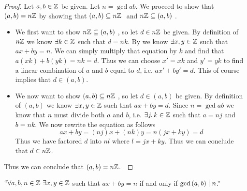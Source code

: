         \begin{proof}
            Let $a, b \in \mathbb{Z}$ be given. Let $n = \gcd{a}{b}$. We proceed to show
            that $(a, b) = n\mathbb{Z}$ by showing that $(a, b) \subseteq n\mathbb{Z} \ $ and 
            $n\mathbb{Z} \subseteq (a, b) \ $.
            \begin{itemize}
                \item
                    We first want to show $n\mathbb{Z} \subseteq (a, b) \ $, so let $d \in n\mathbb{Z}$ be
                    given. By definition of $n\mathbb{Z}$ we know $\exists k \in \mathbb{Z}$ such
                    that $d = nk$. By  we know $\exists
                    x, y \in \mathbb{Z}$ such that $ax + by = n$. We can simply multiply that
                    equation by $k$ and find that $a(xk) + b(yk) = nk = d$. Thus we can choose
                    $x' = xk$ and $y' = yk$ to find a linear combination of $a$ and $b$ equal to
                    $d$, i.e. $ax' + by' = d$. This of course implies that $d \in (a, b)$.
                \item
                    We now want to show $(a, b) \subseteq n\mathbb{Z} \ $, so let $d \in (a, b)$
                    be given. By definition of $(a, b)$ we know $\exists x, y \in \mathbb{Z}$
                    such that $ax + by = d$. Since $n = \gcd{a}{b}$ we know that $n$ must
                    divide both $a$ and $b$, i.e. $\exists j, k \in \mathbb{Z}$ such that
                    $a = nj$ and $b = nk$. We now rewrite the equation as follows
                    \[
                        ax + by = (nj)x + (nk)y = n(jx + ky) = d
                    \]
                    Thus we have factored $d$ into $nl$ where $l = jx + ky$. Thus we can conclude
                    that $d \in n\mathbb{Z}$.
            \end{itemize}
            Thus we can conclude that $(a, b) = n\mathbb{Z}$.~\QED
        \end{proof}
        \begin{corollary}
            $``\forall a, b, n \in \mathbb{Z} \ \exists x, y \in \mathbb{Z}$ such that
            $ax + by = n$ if and only if $\mathrm{gcd}\left(a, b\right) \mid n$.''
            \label{ax + by = n <==> gcd(a, b) | n}
        \end{corollary}
